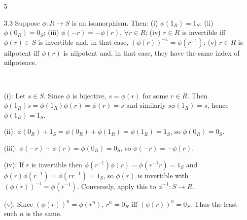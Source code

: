 \documentclass[8pt]{extarticle}
\makeatletter
\renewenvironment{proof}[1][\proofname]{%
  \pushQED{\qed}%
  \par\noindent\normalfont\itshape #1\@addpunct{.}\ \normalfont\ignorespaces
}{%
  \popQED%
  \par
}
\makeatother
\begin{document}
\begin{multicols*}{5}
{{
            }
        }
        \vspace{-1pt}

        \begin{lemma}{3.3}
            Suppose \(\phi:R\to S\) is an isomorphism. Then: (i) \(\phi(1_R)=1_S\); (ii) \(\phi(0_R)=0_S\); (iii) \(\phi(-r)=-\phi(r)\), \(\forall r\in R\); (iv) \(r\in R\) is invertible iff \(\phi(r)\in S\) is invertible and, in that case, \((\phi(r))^{-1}=\phi(r^{-1})\); (v) \(r\in R\) is nilpotent iff \(\phi(r)\) is nilpotent and, in that case, they have the same index of nilpotence.
        \end{lemma}

        \begin{proof}
            (i): Let \(s\in S\). Since \(\phi\) is bijective, \(s=\phi(r)\) for some \(r\in R\). Then \(\phi(1_R)s=\phi(1_R)\phi(r)=\phi(r)=s\) and similarly \(s\phi(1_R)=s\), hence \(\phi(1_R)=1_S\).

            (ii): \(\phi(0_R)+1_S=\phi(0_R)+\phi(1_R)=\phi(1_R)=1_S\), so \(\phi(0_R)=0_S\).

            (iii): \(\phi(-r)+\phi(r)=\phi(0_R)=0_S\), so \(\phi(-r)=-\phi(r)\).

            (iv): If \(r\) is invertible then \(\phi(r^{-1})\phi(r)=\phi(r^{-1}r)=1_S\) and \(\phi(r)\phi(r^{-1})=\phi(rr^{-1})=1_S\), so \(\phi(r)\) is invertible with \((\phi(r))^{-1}=\phi(r^{-1})\). Conversely, apply this to \(\phi^{-1}:S\to R\).

            (v): Since \((\phi(r))^n=\phi(r^n)\), \(r^n=0_R\) iff \((\phi(r))^n=0_S\). Thus the least such \(n\) is the same.
        \end{proof}


\end{multicols*}
\end{document}
